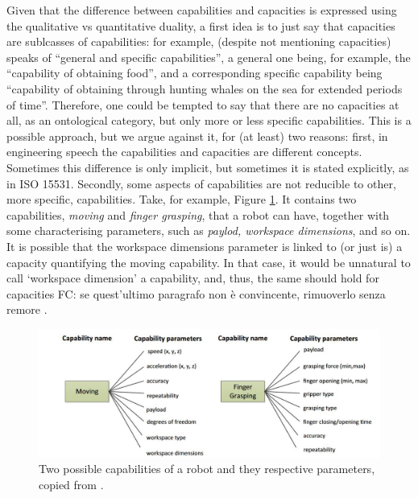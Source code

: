 \documentclass[sw]{iosart2x}
\newcommand{\quotes}[1]{`#1'}
\newcommand{\qquotes}[1]{``#1''}
\newcommand{\TODO}[1]{{\color{red} #1
}}
\begin{document}
Given that the difference between capabilities and capacities is expressed using the qualitative vs quantitative duality, a first idea is to just say that capacities are sublcasses of capabilities: for example, \cite{kochCAPABILITIESBASEDACCOUNTPATIENT2016} (despite not mentioning capacities) speaks of \qquotes{general and specific capabilities}, a general one being, for example, the \qquotes{capability of obtaining food}, and a corresponding specific capability being \qquotes{capability of obtaining through hunting whales on the sea for extended periods of time}. 
Therefore, one could be tempted to say that there are no capacities at all, as an ontological category, but only more or less specific capabilities.
This is a possible approach, but we argue against it, for (at least) two reasons: first, in engineering speech the capabilities and capacities are different concepts. Sometimes this difference is only implicit, but sometimes it is stated explicitly, as in ISO 15531.
Secondly, some aspects of capabilities are not reducible to other, more specific, capabilities.
Take, for example, Figure \ref{fig:capability-parameters}. 
It contains two capabilities, \textit{moving} and \textit{finger grasping}, that a robot can have, together with some characterising parameters, such as \textit{paylod, workspace dimensions}, and so on. 
It is possible that the workspace dimensions parameter is linked to (or just is) a capacity quantifying the moving capability. In that case, it would be unnatural to call \quotes{workspace dimension} a capability, and, thus, the same should hold for capacities\TODO{FC: se quest'ultimo paragrafo non è convincente, rimuoverlo senza remore}. 

\begin{figure}
  \centering
  \includegraphics[width=\textwidth]{capability-parameters.JPG}
  \caption{\label{fig:capability-parameters} Two possible capabilities of a robot and they respective parameters, copied from \cite{jarvenpaaDevelopmentOntologyDescribing2019a}.}%
\end{figure}
\end{document}
